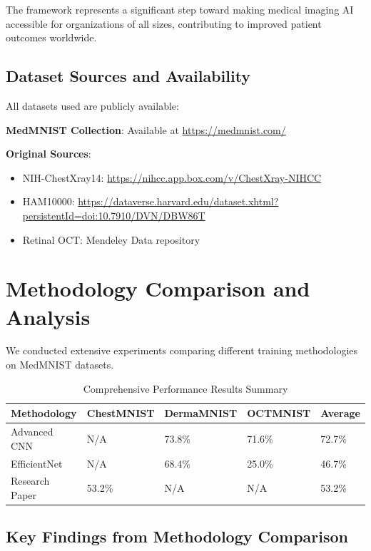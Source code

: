 \documentclass[12pt,a4paper]{article}
\begin{document}
The framework represents a significant step toward making medical imaging AI accessible for organizations of all sizes, contributing to improved patient outcomes worldwide.

\subsection{Dataset Sources and Availability}

All datasets used are publicly available:

\textbf{MedMNIST Collection}: Available at \url{https://medmnist.com/}

\textbf{Original Sources}:
\begin{itemize}
    \item NIH-ChestXray14: \url{https://nihcc.app.box.com/v/ChestXray-NIHCC}
    \item HAM10000: \url{https://dataverse.harvard.edu/dataset.xhtml?persistentId=doi:10.7910/DVN/DBW86T}
    \item Retinal OCT: Mendeley Data repository
\end{itemize}

\section{Methodology Comparison and Analysis}

We conducted extensive experiments comparing different training methodologies on MedMNIST datasets.

\begin{table}[H]
\centering
\caption{Comprehensive Performance Results Summary}
\begin{tabular}{@{}lllll@{}}
\toprule
\textbf{Methodology} & \textbf{ChestMNIST} & \textbf{DermaMNIST} & \textbf{OCTMNIST} & \textbf{Average} \\ \midrule
Advanced CNN & N/A & 73.8\% & 71.6\% & 72.7\% \\
EfficientNet & N/A & 68.4\% & 25.0\% & 46.7\% \\
Research Paper & 53.2\% & N/A & N/A & 53.2\% \\ \bottomrule
\end{tabular}
\end{table}

\subsection{Key Findings from Methodology Comparison}
\end{document}
